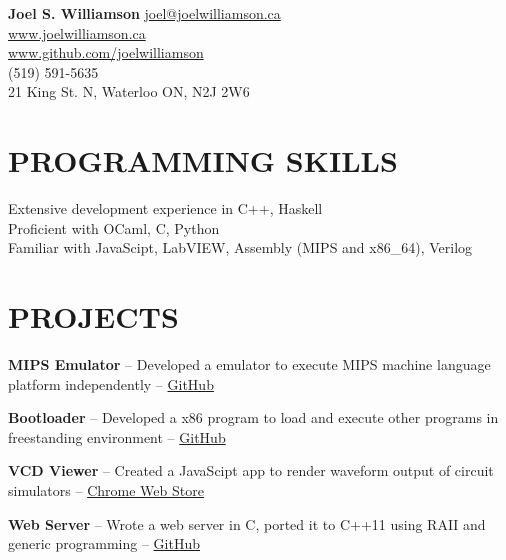 \documentclass{res}
\begin{document}
 

\begin{center}
{\Large\bf Joel S. Williamson}
\vspace{-5mm}
{\center \href{mailto:joel@joelwilliamson.ca}{joel@joelwilliamson.ca}\\\url{www.joelwilliamson.ca}\\\url{www.github.com/joelwilliamson}\\
(519) 591-5635\\21 King St. N, Waterloo ON, N2J 2W6 }
\end{center}
\vspace{-1cm}                 
\begin{resume}

\section{PROGRAMMING SKILLS}          
  \vspace{3mm}
    Extensive development experience in C++, Haskell\\
    Proficient with OCaml, C, Python\\
    Familiar with JavaScipt, LabVIEW, Assembly (MIPS and x86\_64), Verilog
 

\section{PROJECTS}
  \vspace{3mm}
    {\bf MIPS Emulator} -- Developed a emulator to execute MIPS machine language platform independently --
    \href{https://github.com/joelwilliamson/MIPS-emulator}{GitHub}
    \vspace{-3mm}
    
    {\bf Bootloader} -- Developed a x86 program to load and execute other programs in freestanding environment --
    \href{https://github.com/joelwilliamson/AMD64/tree/master/barebones}{GitHub}
    \vspace{-3mm}
    
    {\bf VCD Viewer} -- Created a JavaScipt app to render waveform output of circuit simulators --
    \href{https://chrome.google.com/webstore/detail/vcd-viewer/fpacodjpmmabkjooobgbpgpmgbfjidkg?hl=en-US}{Chrome Web Store}
    \vspace{-3mm}
    
    {\bf Web Server} -- Wrote a web server in C, ported it to C++11 using RAII and generic programming --
    \href{https://www.github.com/joelwilliamson/JServer}{GitHub}
    \vspace{-3mm}


\end{resume}
\end{document}
